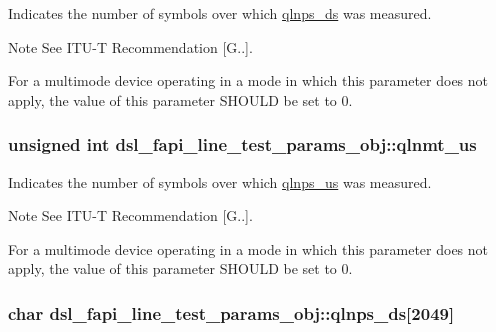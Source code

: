 Indicates the number of symbols over which \hyperlink{structdsl__fapi__line__test__params__obj_ae4b24cb005ff35e5a582b46249891085}{qlnps\-\_\-ds} was measured. \begin{DoxyNote}{Note}
See I\-T\-U-\/\-T Recommendation \mbox{[}G..\mbox{]}. 

For a multimode device operating in a mode in which this parameter does not apply, the value of this parameter S\-H\-O\-U\-L\-D be set to 0. 
\end{DoxyNote}
\hypertarget{structdsl__fapi__line__test__params__obj_a58aaec5d828de778148762eccb6e0a03}{
\subsubsection[{qlnmt\-\_\-us}]{\setlength{\rightskip}{0pt plus 5cm}unsigned int dsl\-\_\-fapi\-\_\-line\-\_\-test\-\_\-params\-\_\-obj\-::qlnmt\-\_\-us}}\label{structdsl__fapi__line__test__params__obj_a58aaec5d828de778148762eccb6e0a03}
Indicates the number of symbols over which \hyperlink{structdsl__fapi__line__test__params__obj_a07497d9f33930bf1ab615c4ee4b5ed59}{qlnps\-\_\-us} was measured. \begin{DoxyNote}{Note}
See I\-T\-U-\/\-T Recommendation \mbox{[}G..\mbox{]}. 

For a multimode device operating in a mode in which this parameter does not apply, the value of this parameter S\-H\-O\-U\-L\-D be set to 0. 
\end{DoxyNote}
\hypertarget{structdsl__fapi__line__test__params__obj_ae4b24cb005ff35e5a582b46249891085}{
\subsubsection[{qlnps\-\_\-ds}]{\setlength{\rightskip}{0pt plus 5cm}char dsl\-\_\-fapi\-\_\-line\-\_\-test\-\_\-params\-\_\-obj\-::qlnps\-\_\-ds\mbox{[}2049\mbox{]}}}\label{structdsl__fapi__line__test__params__obj_ae4b24cb005ff35e5a582b46249891085}
